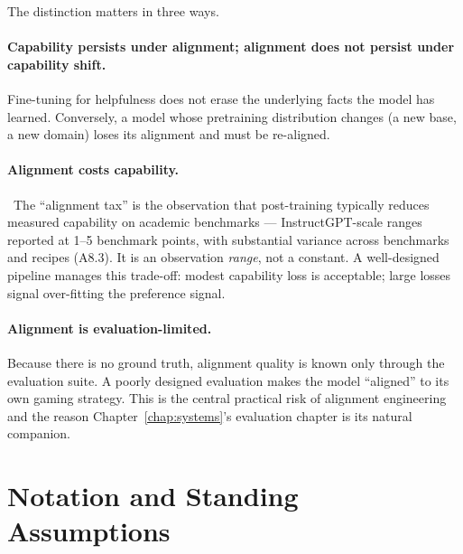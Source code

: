 The distinction matters in three ways.

\paragraph{Capability persists under alignment; alignment does not
persist under capability shift.} Fine-tuning for helpfulness does
not erase the underlying facts the model has learned. Conversely, a
model whose pretraining distribution changes (a new base, a new
domain) loses its alignment and must be re-aligned.

\paragraph{Alignment costs capability.} \Emp\ The ``alignment tax''
\citep{ouyang2022training} is the observation that post-training
typically reduces measured capability on academic benchmarks ---
InstructGPT-scale ranges reported at 1--5 benchmark points, with
substantial variance across benchmarks and recipes (A8.3). It is an
observation \emph{range}, not a constant. A well-designed pipeline
manages this trade-off: modest capability loss is acceptable; large
losses signal over-fitting the preference signal.

\paragraph{Alignment is evaluation-limited.} Because there is no
ground truth, alignment quality is known only through the evaluation
suite. A poorly designed evaluation makes the model ``aligned'' to
its own gaming strategy. This is the central practical risk of
alignment engineering and the reason Chapter~\ref{chap:systems}'s evaluation chapter is
its natural companion.

\section{Notation and Standing Assumptions}
\label{sec:ch9-notation}

